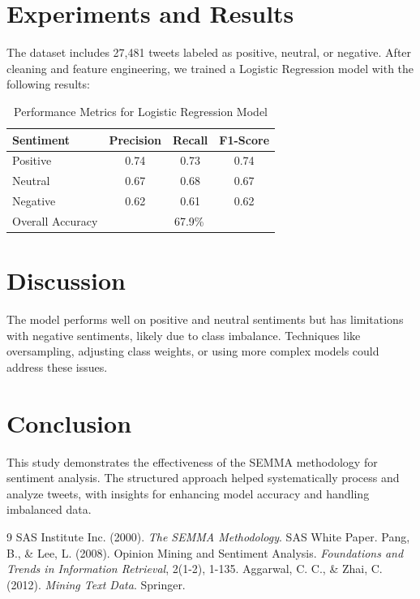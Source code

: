 \documentclass{article}
\begin{document}
\section{Experiments and Results}
The dataset includes 27,481 tweets labeled as positive, neutral, or negative. After cleaning and feature engineering, we trained a Logistic Regression model with the following results:
\begin{table}[h]
    \centering
    \begin{tabular}{lccc}
        \hline
        Sentiment & Precision & Recall & F1-Score \\
        \hline
        Positive & 0.74 & 0.73 & 0.74 \\
        Neutral & 0.67 & 0.68 & 0.67 \\
        Negative & 0.62 & 0.61 & 0.62 \\
        \hline
        Overall Accuracy & \multicolumn{3}{c}{67.9\%} \\
        \hline
    \end{tabular}
    \caption{Performance Metrics for Logistic Regression Model}
\end{table}

\section{Discussion}
The model performs well on positive and neutral sentiments but has limitations with negative sentiments, likely due to class imbalance. Techniques like oversampling, adjusting class weights, or using more complex models could address these issues.

\section{Conclusion}
This study demonstrates the effectiveness of the SEMMA methodology for sentiment analysis. The structured approach helped systematically process and analyze tweets, with insights for enhancing model accuracy and handling imbalanced data.

\begin{thebibliography}{9}
SAS Institute Inc. (2000). \textit{The SEMMA Methodology}. SAS White Paper.
Pang, B., \& Lee, L. (2008). Opinion Mining and Sentiment Analysis. \textit{Foundations and Trends in Information Retrieval}, 2(1-2), 1-135.
Aggarwal, C. C., \& Zhai, C. (2012). \textit{Mining Text Data}. Springer.
\end{thebibliography}
\end{document}
